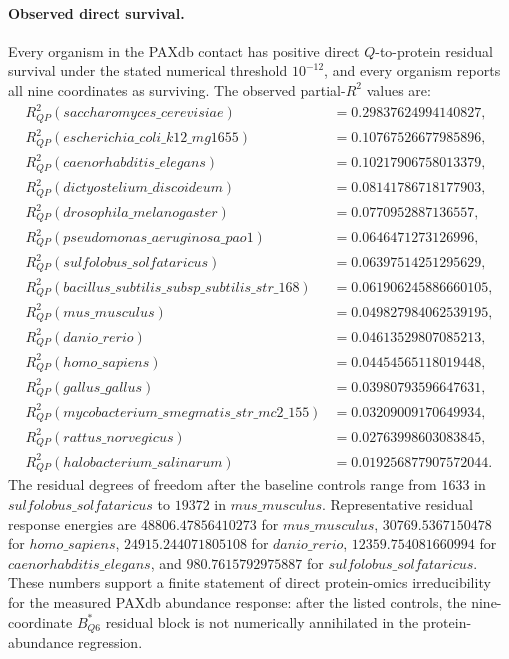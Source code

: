 \paragraph{Observed direct survival.}
Every organism in the PAXdb contact has positive direct $Q$-to-protein residual survival under the stated numerical threshold $10^{-12}$, and every organism reports all nine coordinates as surviving.  The observed partial-$R^2$ values are:
$$
\begin{aligned}
R^2_{QP}(saccharomyces\_cerevisiae)&=0.29837624994140827,\\
R^2_{QP}(escherichia\_coli\_k12\_mg1655)&=0.10767526677985896,\\
R^2_{QP}(caenorhabditis\_elegans)&=0.10217906758013379,\\
R^2_{QP}(dictyostelium\_discoideum)&=0.08141786718177903,\\
R^2_{QP}(drosophila\_melanogaster)&=0.0770952887136557,\\
R^2_{QP}(pseudomonas\_aeruginosa\_pao1)&=0.0646471273126996,\\
R^2_{QP}(sulfolobus\_solfataricus)&=0.06397514251295629,\\
R^2_{QP}(bacillus\_subtilis\_subsp\_subtilis\_str\_168)&=0.061906245886660105,\\
R^2_{QP}(mus\_musculus)&=0.049827984062539195,\\
R^2_{QP}(danio\_rerio)&=0.04613529807085213,\\
R^2_{QP}(homo\_sapiens)&=0.04454565118019448,\\
R^2_{QP}(gallus\_gallus)&=0.03980793596647631,\\
R^2_{QP}(mycobacterium\_smegmatis\_str\_mc2\_155)&=0.03209009170649934,\\
R^2_{QP}(rattus\_norvegicus)&=0.02763998603083845,\\
R^2_{QP}(halobacterium\_salinarum)&=0.019256877907572044.
\end{aligned}
$$
The residual degrees of freedom after the baseline controls range from $1633$ in $sulfolobus\_solfataricus$ to $19372$ in $mus\_musculus$.  Representative residual response energies are $48806.47856410273$ for $mus\_musculus$, $30769.5367150478$ for $homo\_sapiens$, $24915.244071805108$ for $danio\_rerio$, $12359.754081660994$ for $caenorhabditis\_elegans$, and $980.7615792975887$ for $sulfolobus\_solfataricus$.  These numbers support a finite statement of direct protein-omics irreducibility for the measured PAXdb abundance response: after the listed controls, the nine-coordinate $B^{*}_{Q6}$ residual block is not numerically annihilated in the protein-abundance regression.

